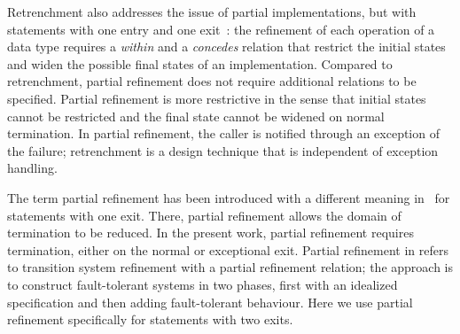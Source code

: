 \documentclass[submission,copyright,creativecommons]{eptcs}
\begin{document}
Retrenchment also addresses the issue of partial implementations, but with statements with one entry and one exit~\cite{BanachaPoppletonJeskeaStepney07Retrenchment}: the refinement of each operation of a data type requires a \emph{within} and a \emph{concedes} relation that restrict the initial states and widen the possible final states of an implementation. Compared to retrenchment, partial refinement does not require additional relations to be specified. Partial refinement is more restrictive in the sense that initial states cannot be restricted and the final state cannot be widened on normal termination. In partial refinement, the caller is notified through an exception of the failure; retrenchment is a design technique that is independent of exception handling.

The term partial refinement has been introduced with a different meaning in~\cite{Back81CorrectRefinement} for statements with one exit. There, partial refinement allows the domain of termination to be reduced. In the present work, partial refinement requires termination, either on the normal or exceptional exit. Partial refinement in \cite{JeffordsHeitmeyerArcherLeonard09CorrectFaultTolerantSystems} refers to transition system refinement with a partial refinement relation; the approach is to construct fault-tolerant systems in two phases, first with an idealized specification and then adding fault-tolerant behaviour. Here we use partial refinement specifically for statements with two exits.
\end{document}
